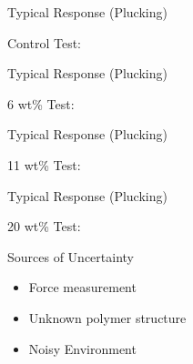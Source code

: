 \documentclass[hyperref=pdftex, presentation]{beamer}
\begin{document}
\begin{frame}{Typical Response (Plucking)}
 \begin{block}{Control Test:}
 \begin{center}
 \end{center}
\end{block}
\end{frame}



\begin{frame}{Typical Response (Plucking)}
 \begin{block}{6 wt\% Test:}
 \begin{center}
 \end{center}
  \end{block}
\end{frame}


\begin{frame}{Typical Response (Plucking)}
 \begin{block}{11 wt\% Test:}
 \begin{center}
 \end{center}
  \end{block}
\end{frame}


\begin{frame}{Typical Response (Plucking)}
 \begin{block}{20 wt\% Test:}
 \begin{center}
 \end{center}
 \end{block}
\end{frame}


\begin{frame}{Sources of Uncertainty}
\begin{center}
\end{center}
\begin{itemize}
\item Force measurement
\item Unknown polymer structure
\item Noisy Environment
\end{itemize}
\end{frame}
\end{document}
